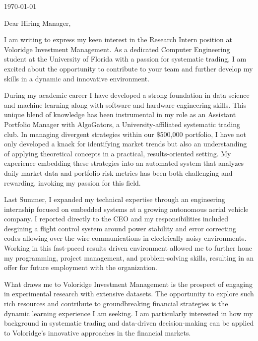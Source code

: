 \documentclass{ExpressiveCoverLetter}
\begin{document}
\sloppy

\coverletterheader[
    firstname=COLE,
    middleinitial=H,
    lastname=Rottenberg,
    email=cole.rottenberg@gmail.com,
    phone=407-961-0600,
    linkedin=cole-rottenberg,
    github=colerottenberg,
    city=Orlando,
    state=Florida,
]

\today

Dear Hiring Manager,

I am writing to express my keen interest in the Research Intern position
at Voloridge Investment Management.
As a dedicated Computer Engineering student at the University of Florida
with a passion for systematic trading, I am excited about the
opportunity to contribute to your team and further develop my skills in
a dynamic and innovative environment.

During my academic career I have developed a strong foundation in data
science and machine learning along with software and hardware
engineering skills. This unique blend of knowledge has been instrumental
in my role as an Assistant Portfolio Manager with AlgoGators, a
University-affiliated systematic trading club. In managing divergent
strategies within our \$500,000 portfolio, I have not only developed a
knack for identifying market trends but also an understanding of
applying theoretical concepts in a practical, results-oriented setting.
My experience embedding these strategies into an automated system that
analyzes daily market data and portfolio risk metrics has been both challenging and
rewarding, invoking my passion for this field.

Last Summer, I expanded my technical expertise through an engineering
internship focused on embedded systems at a growing autonomous aerial
vehicle company. I reported directly to the CEO and my responsibilities
included desgining a flight control system around power stability and
error correcting codes allowing over the wire communications in
electrically noisy environments. Working in this fast-paced results
driven environment allowed me to further hone my programming, project
management, and problem-solving skills, resulting in an offer for future
employment with the organization.

What draws me to Voloridge Investment Management is the prospect of
engaging in experimental research with extensive datasets. The
opportunity to explore such rich resources and contribute to
groundbreaking financial strategies is the dynamic learning experience I
am seeking. I am particularly interested in how my background in
systematic trading and data-driven decision-making can be applied to
Voloridge’s innovative approaches in the financial markets.
\end{document}

